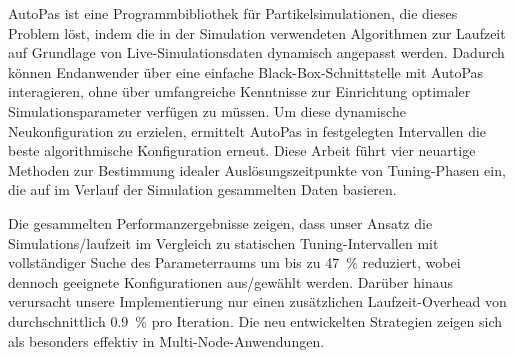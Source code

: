 AutoPas ist eine Programmbibliothek für Partikelsimulationen, die dieses Problem löst, indem die in der Simulation verwendeten Algorithmen zur Laufzeit auf Grundlage von Live-Simulationsdaten dynamisch angepasst werden. Dadurch können Endanwender über eine einfache Black-Box-Schnittstelle mit AutoPas interagieren, ohne über umfangreiche Kenntnisse zur Einrichtung optimaler Simulationsparameter verfügen zu müssen. Um diese dynamische Neukonfiguration zu erzielen, ermittelt AutoPas in festgelegten Intervallen die beste algorithmische Konfiguration erneut. Diese Arbeit führt vier neuartige Methoden zur Bestimmung idealer Auslösungszeitpunkte von Tuning-Phasen ein, die auf im Verlauf der Simulation gesammelten Daten basieren.

Die gesammelten Performanzergebnisse zeigen, dass unser Ansatz die Simulations\-/laufzeit im Vergleich zu statischen Tuning-Intervallen mit vollständiger Suche des Parameterraums um bis zu \qty{47}{\percent} reduziert, wobei dennoch geeignete Konfigurationen aus\-/gewählt werden. Darüber hinaus verursacht unsere Implementierung nur einen zusätzlichen Laufzeit-Overhead von  durchschnittlich \qty{0.9}{\percent} pro Iteration. Die neu entwickelten Strategien zeigen sich als besonders effektiv in Multi-Node-Anwendungen.


\MediaOptionLogicBlank